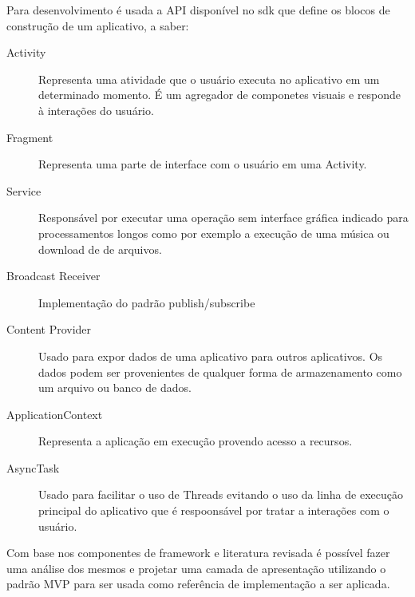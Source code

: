 Para desenvolvimento é usada a API disponível no sdk que define
os blocos de construção de um aplicativo, a saber:

\begin{description}
  \item[Activity] Representa uma atividade que o usuário executa no aplicativo
  em um determinado momento. É um agregador de componetes visuais e responde à
  interações do usuário.
  \item[Fragment] Representa uma parte de interface com o usuário em uma
  Activity.
  \item[Service] Responsável por executar uma operação sem interface gráfica
  indicado para processamentos longos como por exemplo a execução de uma música
  ou download de de arquivos.
  \item[Broadcast Receiver] Implementação do padrão publish/subscribe 
  \item[Content Provider] Usado para expor dados de uma aplicativo para outros
  aplicativos. Os dados podem ser provenientes de qualquer forma de
  armazenamento como um arquivo ou banco de dados.
  \item[ApplicationContext] Representa a aplicação em execução provendo acesso
  a recursos.
  \item[AsyncTask] Usado para facilitar o uso de Threads evitando o uso
  da linha de execução principal do aplicativo que é respoonsável por tratar a
  interações com o usuário.
\end{description}

Com base nos componentes de framework e literatura revisada é possível fazer
uma análise dos mesmos e projetar uma camada de apresentação utilizando o padrão
MVP para ser usada como referência de implementação a ser aplicada.
